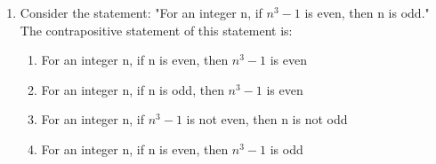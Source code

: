 \documentclass[journal,,12pt,onecolumn]{IEEEtran}
\theoremstyle{remark}
\begin{document}
\begin{enumerate}
 
 \item Consider the statement: "For an integer n, if $n^3-1$ is even, then n is odd." The contrapositive statement of this statement is:
 \begin{enumerate}
     \item For an integer n, if n is even, then $n^3-1$ is even
     \item For an integer n, if n is odd, then $n^3-1$ is even
     \item For an integer n, if $n^3-1$ is not even, then n is not odd
     \item For an integer n, if n is even, then $n^3-1$ is odd
 \end{enumerate}
 \end{enumerate}

 
\end{document}
